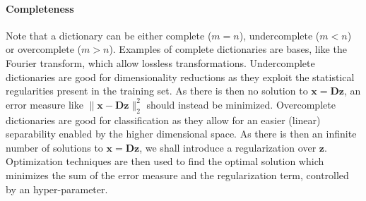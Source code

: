 \documentclass[a4paper,12pt,twoside]{report}
\newcommand{\normT}[1]{\| #1 \|_2^2}
\newcommand{\D}{\mathbf{D}}
\newcommand{\x}{\mathbf{x}}
\newcommand{\z}{\mathbf{z}}
\begin{document}
\paragraph{Completeness}
Note that a dictionary can be either complete ($m=n$), undercomplete ($m<n$) or overcomplete ($m>n$).
Examples of complete dictionaries are bases, like the Fourier transform, which allow lossless transformations.
Undercomplete dictionaries are good for dimensionality reductions as they exploit the statistical regularities present in the training set. As there is then no solution to $\x = \D\z$, an error measure like $\normT{\x - \D\z}$ should instead be minimized.
Overcomplete dictionaries are good for classification as they allow for an easier (linear) separability enabled by the higher dimensional space. As there is then an infinite number of solutions to $\x = \D\z$, we shall introduce a regularization over $\z$. Optimization techniques are then used to find the optimal solution which minimizes the sum of the error measure and the regularization term, controlled by an hyper-parameter.
\end{document}
